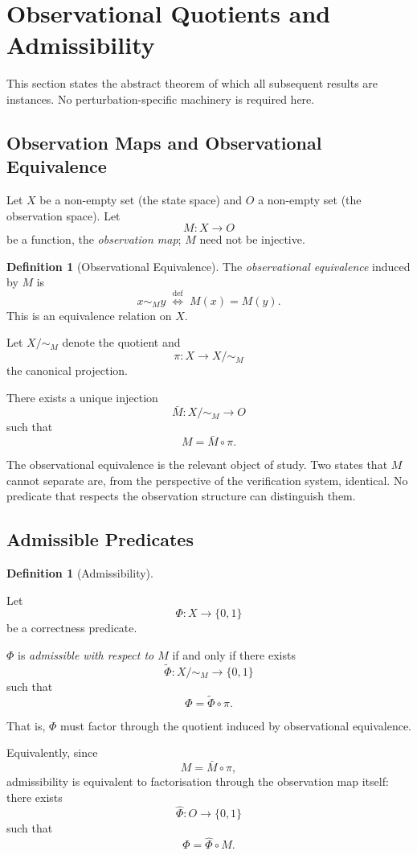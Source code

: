 \documentclass[12pt]{article}
\theoremstyle{plain}
\theoremstyle{definition}
\newtheorem{definition}[theorem]{Definition}
\theoremstyle{remark}
\begin{document}
\section{Observational Quotients and Admissibility}
\label{sec:quotients}

This section states the abstract theorem of which all subsequent
results are instances.
No perturbation-specific machinery is required here.

\subsection{Observation Maps and Observational Equivalence}

Let $X$ be a non-empty set (the state space) and $O$ a non-empty set
(the observation space).
Let
\[
M : X \to O
\]
be a function, the \emph{observation map}; $M$ need not be injective.

\begin{definition}[Observational Equivalence]
The \emph{observational equivalence} induced by $M$ is
\[
x \sim_M y
\;\stackrel{\mathrm{def}}{\iff}\;
M(x) = M(y).
\]
This is an equivalence relation on $X$.

Let $X/{\sim_M}$ denote the quotient and
\[
\pi : X \to X/{\sim_M}
\]
the canonical projection.

There exists a unique injection
\[
\bar{M} : X/{\sim_M} \to O
\]
such that
\[
M = \bar{M} \circ \pi.
\]
\end{definition}

The observational equivalence is the relevant object of study.
Two states that $M$ cannot separate are, from the perspective of the
verification system, identical.
No predicate that respects the observation structure can distinguish
them.

\subsection{Admissible Predicates}

\begin{definition}[Admissibility]
\label{def:admissibility}

Let
\[
\Phi : X \to \{0,1\}
\]
be a correctness predicate.

$\Phi$ is \emph{admissible with respect to $M$} if and only if there
exists
\[
\widetilde{\Phi} : X/{\sim_M} \to \{0,1\}
\]
such that
\[
\Phi = \widetilde{\Phi} \circ \pi.
\]

That is, $\Phi$ must factor through the quotient induced by
observational equivalence.

Equivalently, since
\[
M = \bar{M} \circ \pi,
\]
admissibility is equivalent to factorisation through the observation
map itself: there exists
\[
\hat{\Phi} : O \to \{0,1\}
\]
such that
\[
\Phi = \hat{\Phi} \circ M.
\]
\end{definition}
\end{document}
